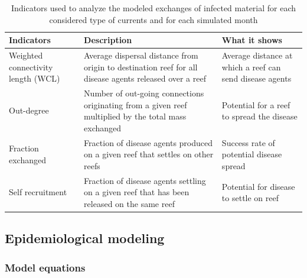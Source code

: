 \documentclass[utf8]{frontiersSCNS}
\begin{document}
\begin{table}
    \centering
    \begin{tabular}{|p{4cm}|p{5cm}|p{4cm}|}
        \hline
        \textbf{Indicators} & \textbf{Description} & \textbf{What it shows} \\
        \hline
            Weighted connectivity length (WCL) & 
            Average dispersal distance from origin to destination reef for all disease agents released over a reef & 
            Average distance at which a reef can send disease agents \\
        \hline
            Out-degree &
            Number of out-going connections originating from a given reef multiplied by the total mass exchanged  &
            Potential for a reef to spread the disease \\
        \hline
            Fraction exchanged &
            Fraction of disease agents produced on a given reef that settles on other reefs &
            Success rate of potential disease spread  \\
        \hline
            Self recruitment &
            Fraction of disease agents settling on a given reef that has been released on the same reef &
            Potential for disease to settle on reef \\
        \hline            
    \end{tabular}
    \caption{Indicators used to analyze the modeled exchanges of infected material for each considered type of currents and for each simulated month}
    \label{tab:indicator}
\end{table}

\subsection{Epidemiological modeling}

\subsubsection{Model equations}
\end{document}
